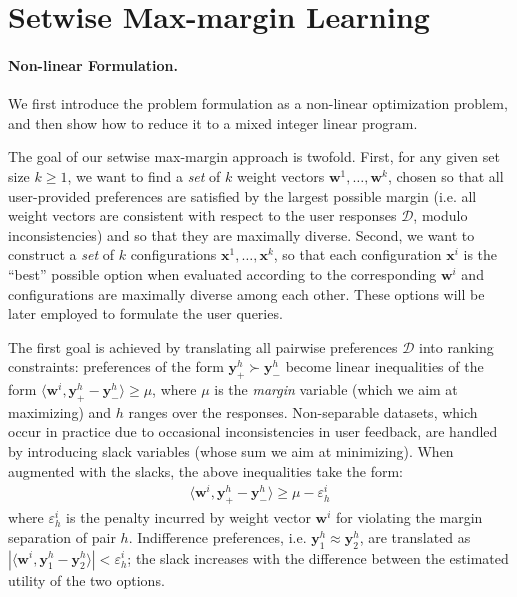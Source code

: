 \documentclass{article}
\renewcommand\[{\begin{equation}}
\renewcommand\]{\end{equation}}
\newcommand{\calvar}[1]{\ensuremath{\mathcal{#1}}}
\newcommand{\calD}{\calvar{D}}
\newcommand{\vecvar}[1]{\ensuremath{\boldsymbol{#1}}}
\newcommand{\vw}{\vecvar{w}}
\newcommand{\vx}{\vecvar{x}}
\newcommand{\vy}{\vecvar{y}}
\begin{document}
\section{Setwise Max-margin Learning}
\label{sec:formulation}
\paragraph{Non-linear Formulation.} We first introduce the problem
formulation as a %
non-linear optimization problem, and
then show how to reduce it to a mixed integer linear program.%

The goal of our setwise max-margin approach is twofold. First, for any
given set size $k\geq 1$, we want to find a {\em set} of $k$ weight
vectors $\vw^{1}, \ldots, \vw^{k}$, chosen so that all user-provided
preferences are satisfied by the largest possible margin (i.e. all
weight vectors are consistent with respect to the user responses
$\calD$, modulo inconsistencies) and so that they are maximally
diverse.  Second, we want to construct a {\em set} of $k$
configurations $\vx^{1}, \ldots, \vx^{k}$, so that each configuration
$\vx^{i}$ is the ``best'' possible option when evaluated according to
the corresponding $\vw^{i}$ and configurations are maximally diverse
among each other. These options will be later employed to formulate
the user queries.

The first goal is achieved by translating all pairwise preferences
$\calD$ into ranking constraints: preferences of the form
$\vy^h_+ \succ \vy^h_-$ become linear inequalities of the form
$\langle \vw^i, \vy^h_+ - \vy^h_- \rangle \geq \mu$, where $\mu$ is the
{\em margin} variable (which we aim at maximizing) and $h$ ranges over
the responses.  Non-separable datasets, which occur in practice due to
occasional inconsistencies in user feedback, are handled by
introducing slack variables (whose sum we aim at minimizing). When
augmented with the slacks, the above inequalities take the form:
\begin{align*}
\langle \vw^{i}, \vy^{h}_+ - \vy^{h}_- \rangle \ge \mu - \varepsilon^{i}_h 
\end{align*}
where $\varepsilon^{i}_h$ is the penalty incurred by weight vector $\vw^{i}$
for violating the margin separation of pair $h$. Indifference preferences, i.e.
$\vy^h_1 \approx \vy^h_2$, are translated as $|\langle \vw^i, \vy^h_1 - \vy^h_2 \rangle| < \varepsilon^i_h$;
the slack increases with the difference between the estimated utility of the
two options.
\end{document}
